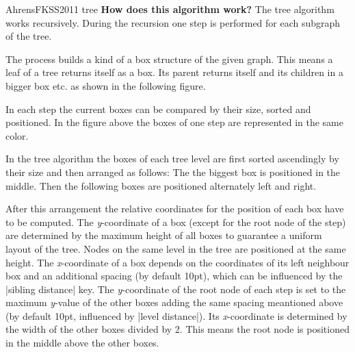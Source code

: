 \begin{gdalgorithm}{AhrensFKSS2011 tree}
  \medskip
  \textbf{How does this algorithm work?}
  The tree algorithm works recursively. During the recursion one step is
  performed for each subgraph of the tree.  

  The process builds a kind of a box structure of the given graph. This
  means a leaf of a tree returns itself as a box. Its parent returns
  itself and its children in a bigger box etc. as shown in the following
  figure. 

\begin{quote}
\end{quote}

  In each step the current boxes can be compared by their size, sorted
  and positioned. In the figure above the boxes of one step are
  represented in the same color. 
  
  In the tree algorithm the boxes of each tree level are first sorted
  ascendingly by their size and then arranged as follows: The the
  biggest box is positioned in the middle. Then the following boxes are
  positioned alternately left and right. 
  
  After this arrangement the relative coordinates for the position of
  each box have to be computed. The \emph{y}-coordinate of a box (except
  for the root node of the step) are determined by the maximum height of
  all boxes to guarantee a uniform layout of the tree. Nodes on the same
  level in the tree are positioned at the same height. The
  \emph{x}-coordinate of a box depends on the coordinates of its left
  neighbour box and an additional spacing (by default 10pt), which can
  be influenced by the |sibling distance| key. The \emph{y}-coordinate
  of the root node of each step is set to the maximum \emph{y}-value of
  the other boxes adding the same spacing meantioned above (by default
  10pt, influenced by |level distance|). Its \emph{x}-coordinate is
  determined by the width of the other boxes divided by 2. This means
  the root node is positioned in the middle above the other boxes. 
  

\end{gdalgorithm}
